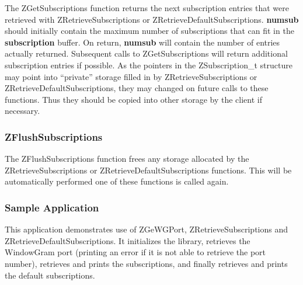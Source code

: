 \etemplate
{}

The ZGetSubscriptions function returns the next subscription entries
that were retrieved with ZRetrieveSubscriptions or
ZRetrieveDefaultSubscriptions.  {\bf *numsub} should initially contain
the maximum number of subscriptions that can fit in the {\bf
subscription} buffer.  On return, {\bf *numsub} will contain the
number of entries actually returned.  Subsequent calls to
ZGetSubscriptions will return additional subscription entries if
possible.  As the pointers in the ZSubscription_t structure may point
into ``private'' storage filled in by ZRetrieveSubscriptions or
ZRetrieveDefaultSubscriptions, they may changed on
future calls to these functions.  Thus they should be copied into other
storage by the client if necessary.

\subsubsection{ZFlushSubscriptions}
\label{ZFlushSubscriptions}

\etemplate
{}

The ZFlushSubscriptions function frees any storage allocated by
the ZRetrieveSubscriptions or ZRetrieveDefaultSubscriptions functions.
This will be automatically performed one of these functions is called again.

\subsubsection{Sample Application}

This application demonstrates use of ZGeWGPort, ZRetrieveSubscriptions
and ZRetrieveDefaultSubscriptions.  It initializes the library,
retrieves the WindowGram port (printing an error if it is not able to
retrieve the port number), retrieves and prints the subscriptions, and
finally retrieves and prints the default subscriptions.

